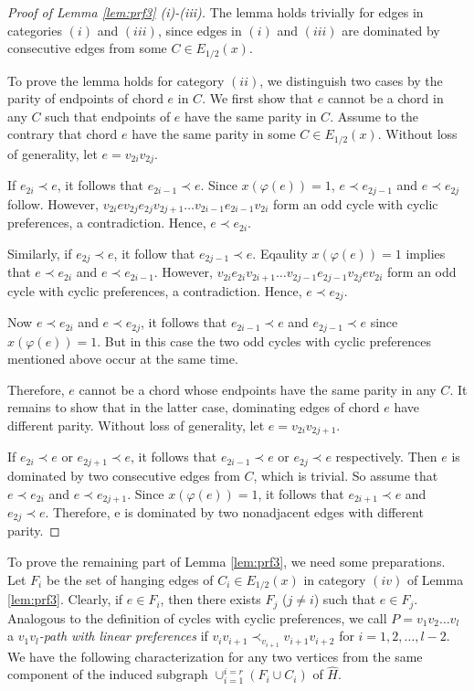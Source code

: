 \documentclass[11pt]{article}
\numberwithin{theorem}{section}
\begin{document}
\begin{proof}[Proof of Lemma \ref{lem:prf3} \emph{(}i\emph{)}-\emph{(}iii\emph{)}]
The lemma holds trivially for edges in categories $(i)$ and $(iii)$, since edges in $(i)$ and $(iii)$ are dominated by consecutive edges from some $C\in E_{1/2}(x)$.

To prove the lemma holds for category $(ii)$, we distinguish two cases by the parity of endpoints of chord $e$ in $C$. We first show that $e$ cannot be a chord in any $C$ such that endpoints of $e$ have the same parity in $C$. Assume to the contrary that chord $e$ have the same parity in some $C\in E_{1/2}(x)$. Without loss of generality, let $e=v_{2i}v_{2j}$.

If $e_{2i}\prec e$, it follows that $e_{2i-1}\prec e$. Since $x(\varphi(e))=1$, $e\prec e_{2j-1}$ and $e\prec e_{2j}$ follow. However, $v_{2i} e v_{2j} e_{2j} v_{2j+1} \ldots v_{2i-1} e_{2i-1} v_{2i}$ form an odd cycle with cyclic preferences, a contradiction. Hence, $e\prec e_{2i}$.

Similarly, if $e_{2j}\prec e$, it follow that $e_{2j-1}\prec e$. Eqaulity $x(\varphi(e))=1$ implies that $e\prec e_{2i}$ and $e\prec e_{2i-1}$. However, $v_{2i} e_{2i} v_{2i+1} \ldots v_{2j-1} e_{2j-1} v_{2j} e v_{2i}$ form an odd cycle with cyclic preferences, a contradiction. Hence, $e\prec e_{2j}$. 

Now $e\prec e_{2i}$ and $e\prec e_{2j}$, it follows that $e_{2i-1}\prec e$ and $e_{2j-1}\prec e$ since $x(\varphi(e))=1$. But in this case the two odd cycles with cyclic preferences mentioned above occur at the same time. 

Therefore, $e$ cannot be a chord whose endpoints have the same parity in any $C$. It remains to show that in the latter case, dominating edges of chord $e$ have different parity. Without loss of generality, let $e=v_{2i} v_{2j+1}$.

If $e_{2i}\prec e$ or $e_{2j+1}\prec e$, it follows that $e_{2i-1}\prec e$ or $e_{2j}\prec e$ respectively. Then $e$ is dominated by two consecutive edges from $C$, which is trivial.  So assume that $e\prec e_{2i}$ and $e\prec e_{2j+1}$. Since $x(\varphi(e))=1$, it follows that $e_{2i+1}\prec e$ and $e_{2j}\prec e$. Therefore, e is dominated by two nonadjacent edges with different parity.
\end{proof}

To prove the remaining part of Lemma \ref{lem:prf3}, we need some preparations. Let $F_i$ be the set of hanging edges of $C_i\in E_{1/2}(x)$ in category $(iv)$ of Lemma \ref{lem:prf3}. Clearly, if $e\in F_i$, then there exists $F_j$ ($j\not= i$) such that $e\in F_j$. Analogous to the definition of cycles with cyclic preferences, we call $P=v_1 v_2 \ldots v_l$ a \textit{$v_1 v_l$-path with linear preferences} if $v_iv_{i+1}\prec_{v_{i+1}}v_{i+1}v_{i+2}$ for $i=1,2,\ldots,l-2$. We have the following characterization for any two vertices from the same component of the induced subgraph $\cup_{i=1}^{i=r} (F_i\cup C_i)$ of $\hat{H}$.
\end{document}
